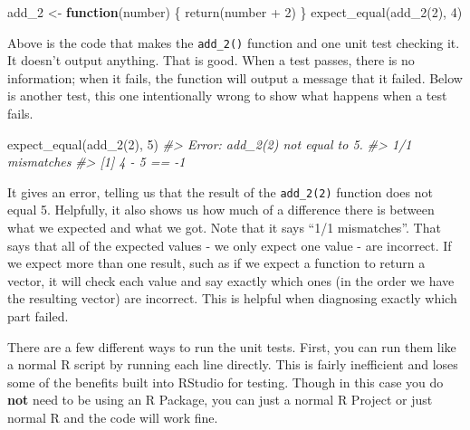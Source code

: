\documentclass[
]{krantz}
\makeatletter
\newenvironment{Shaded}{\begin{snugshade}}{\end{snugshade}}
\newcommand{\CommentTok}[1]{\textcolor[rgb]{0.37,0.37,0.37}{\textit{#1}}}
\newcommand{\ControlFlowTok}[1]{\textcolor[rgb]{0.27,0.27,0.27}{\textbf{#1}}}
\newcommand{\DecValTok}[1]{\textcolor[rgb]{0.06,0.06,0.06}{#1}}
\newcommand{\FunctionTok}[1]{\textcolor[rgb]{0,0,0}{#1}}
\newcommand{\NormalTok}[1]{#1}
\newcommand{\OtherTok}[1]{\textcolor[rgb]{0.37,0.37,0.37}{#1}}
\newcommand{\SpecialCharTok}[1]{\textcolor[rgb]{0,0,0}{#1}}
\newenvironment{kframe}{%
\medskip{}
\setlength{\fboxsep}{.8em}
 \def\at@end@of@kframe{}%
 \ifinner\ifhmode%
  \def\at@end@of@kframe{\end{minipage}}%
  \begin{minipage}{\columnwidth}%
 \fi\fi%
 \def\FrameCommand##1{\hskip\@totalleftmargin \hskip-\fboxsep
 \colorbox{shadecolor}{##1}\hskip-\fboxsep
     \hskip-\linewidth \hskip-\@totalleftmargin \hskip\columnwidth}%
 \MakeFramed {\advance\hsize-\width
   \@totalleftmargin\z@ \linewidth\hsize
   \@setminipage}}%
 {\par\unskip\endMakeFramed%
 \at@end@of@kframe}
\renewenvironment{Shaded}{\begin{kframe}}{\end{kframe}}
\makeatother
\begin{document}
\begin{Shaded}
\begin{Highlighting}[]
\NormalTok{add\_2 }\OtherTok{\textless{}{-}} \ControlFlowTok{function}\NormalTok{(number) \{ }\FunctionTok{return}\NormalTok{(number }\SpecialCharTok{+} \DecValTok{2}\NormalTok{) \}}
\FunctionTok{expect\_equal}\NormalTok{(}\FunctionTok{add\_2}\NormalTok{(}\DecValTok{2}\NormalTok{), }\DecValTok{4}\NormalTok{)}
\end{Highlighting}
\end{Shaded}

Above is the code that makes the \texttt{add\_2()} function and one unit test checking it. It doesn't output anything. That is good. When a test passes, there is no information; when it fails, the function will output a message that it failed. Below is another test, this one intentionally wrong to show what happens when a test fails.

\begin{Shaded}
\begin{Highlighting}[]
\FunctionTok{expect\_equal}\NormalTok{(}\FunctionTok{add\_2}\NormalTok{(}\DecValTok{2}\NormalTok{), }\DecValTok{5}\NormalTok{)}
\CommentTok{\#\textgreater{} Error: add\_2(2) not equal to 5.}
\CommentTok{\#\textgreater{} 1/1 mismatches}
\CommentTok{\#\textgreater{} [1] 4 {-} 5 == {-}1}
\end{Highlighting}
\end{Shaded}

It gives an error, telling us that the result of the \texttt{add\_2(2)} function does not equal 5. Helpfully, it also shows us how much of a difference there is between what we expected and what we got. Note that it says ``1/1 mismatches''. That says that all of the expected values - we only expect one value - are incorrect. If we expect more than one result, such as if we expect a function to return a vector, it will check each value and say exactly which ones (in the order we have the resulting vector) are incorrect. This is helpful when diagnosing exactly which part failed.

There are a few different ways to run the unit tests. First, you can run them like a normal R script by running each line directly. This is fairly inefficient and loses some of the benefits built into RStudio for testing. Though in this case you do \textbf{not} need to be using an R Package, you can just a normal R Project or just normal R and the code will work fine.
\end{document}
